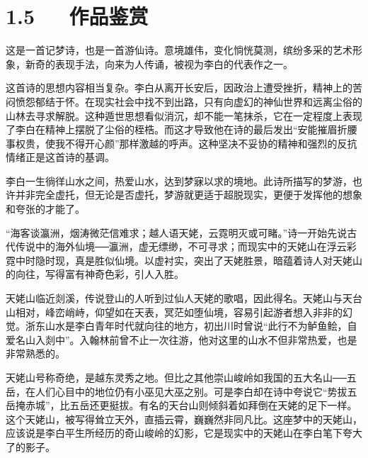 \documentclass[letterpaper,12pt,english]{sphinxmanual}
\begin{document}
\section{1.5   作品鉴赏}
\label{\detokenize{p01_u6563_u6587/_u674e_u767d-_u68a6_u6e38_u5929_u59e5_u541f_u7559_u522b:id7}}
这是一首记梦诗，也是一首游仙诗。意境雄伟，变化惝恍莫测，缤纷多采的艺术形象，新奇的表现手法，向来为人传诵，被视为李白的代表作之一。

这首诗的思想内容相当复杂。李白从离开长安后，因政治上遭受挫折，精神上的苦闷愤怨郁结于怀。在现实社会中找不到出路，只有向虚幻的神仙世界和远离尘俗的山林去寻求解脱。这种遁世思想看似消沉，却不能一笔抹杀，它在一定程度上表现了李白在精神上摆脱了尘俗的桎梏。而这才导致他在诗的最后发出“安能摧眉折腰事权贵，使我不得开心颜”那样激越的呼声。这种坚决不妥协的精神和强烈的反抗情绪正是这首诗的基调。

李白一生徜徉山水之间，热爱山水，达到梦寐以求的境地。此诗所描写的梦游，也许并非完全虚托，但无论是否虚托，梦游就更适于超脱现实，更便于发挥他的想象和夸张的才能了。

“海客谈瀛洲，烟涛微茫信难求；越人语天姥，云霓明灭或可睹。”诗一开始先说古代传说中的海外仙境──瀛洲，虚无缥缈，不可寻求；而现实中的天姥山在浮云彩霓中时隐时现，真是胜似仙境。以虚衬实，突出了天姥胜景，暗蕴着诗人对天姥山的向往，写得富有神奇色彩，引人入胜。

天姥山临近剡溪，传说登山的人听到过仙人天姥的歌唱，因此得名。天姥山与天台山相对，峰峦峭峙，仰望如在天表，冥茫如堕仙境，容易引起游者想入非非的幻觉。浙东山水是李白青年时代就向往的地方，初出川时曾说“此行不为鲈鱼鲙，自爱名山入剡中”。入翰林前曾不止一次往游，他对这里的山水不但非常热爱，也是非常熟悉的。

天姥山号称奇绝，是越东灵秀之地。但比之其他崇山峻岭如我国的五大名山──五岳，在人们心目中的地位仍有小巫见大巫之别。可是李白却在诗中夸说它“势拔五岳掩赤城”，比五岳还更挺拔。有名的天台山则倾斜着如拜倒在天姥的足下一样。这个天姥山，被写得耸立天外，直插云霄，巍巍然非同凡比。这座梦中的天姥山，应该说是李白平生所经历的奇山峻岭的幻影，它是现实中的天姥山在李白笔下夸大了的影子。
\end{document}
